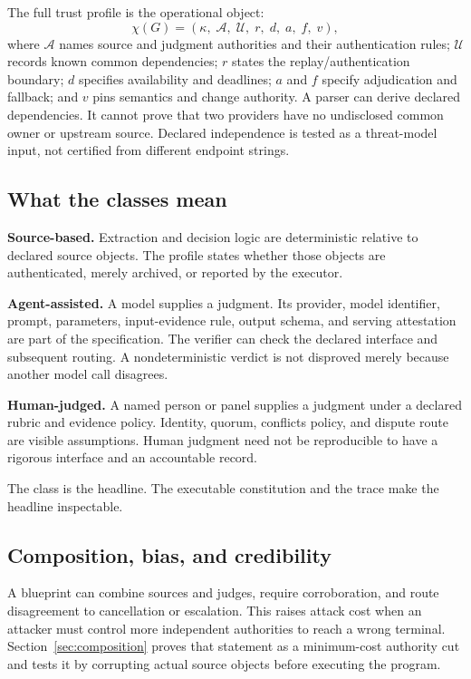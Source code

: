 \documentclass[10pt]{article}
\begin{document}
The full trust profile is the operational object:
\[
\chi(G)=(\kappa,\;\mathcal A,\;\mathcal U,\;r,\;d,\;a,\;f,\;v),
\]
where $\mathcal A$ names source and judgment authorities and their authentication rules; $\mathcal U$ records known common dependencies; $r$ states the replay/authentication boundary; $d$ specifies availability and deadlines; $a$ and $f$ specify adjudication and fallback; and $v$ pins semantics and change authority. A parser can derive declared dependencies. It cannot prove that two providers have no undisclosed common owner or upstream source. Declared independence is tested as a threat-model input, not certified from different endpoint strings.

\subsection{What the classes mean}

\textbf{Source-based.} Extraction and decision logic are deterministic relative to declared source objects. The profile states whether those objects are authenticated, merely archived, or reported by the executor.

\textbf{Agent-assisted.} A model supplies a judgment. Its provider, model identifier, prompt, parameters, input-evidence rule, output schema, and serving attestation are part of the specification. The verifier can check the declared interface and subsequent routing. A nondeterministic verdict is not disproved merely because another model call disagrees.

\textbf{Human-judged.} A named person or panel supplies a judgment under a declared rubric and evidence policy. Identity, quorum, conflicts policy, and dispute route are visible assumptions. Human judgment need not be reproducible to have a rigorous interface and an accountable record.

The class is the headline. The executable constitution and the trace make the headline inspectable.

\subsection{Composition, bias, and credibility}
\label{sec:llmbias}

A blueprint can combine sources and judges, require corroboration, and route disagreement to cancellation or escalation. This raises attack cost when an attacker must control more independent authorities to reach a wrong terminal. Section~\ref{sec:composition} proves that statement as a minimum-cost authority cut and tests it by corrupting actual source objects before executing the program.
\end{document}
